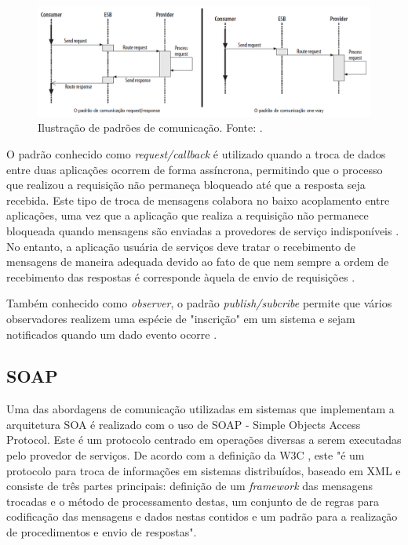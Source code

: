 \begin{figure}[htb]
\centering
\includegraphics[scale=0.5]{figuras/padroes_comunicacao.png}
\caption{Ilustração de padrões de comunicação. Fonte: \cite{josuttis_soa_2007}.}
\label{padroes_comunicacao}
\end{figure}

O padrão conhecido como \textit{request/callback} é utilizado quando a troca de dados entre duas aplicações ocorrem de forma assíncrona, permitindo que o processo que realizou a requisição não permaneça bloqueado até que a resposta seja recebida. Este tipo de troca de mensagens colabora no baixo acoplamento entre aplicações, uma vez que a aplicação que realiza a requisição não permanece bloqueada quando mensagens são enviadas a provedores de serviço indisponíveis \cite{josuttis_soa_2007}. No entanto, a aplicação usuária de serviços deve tratar o recebimento de mensagens de maneira adequada devido ao fato de que nem sempre a ordem de recebimento das respostas é corresponde àquela de envio de requisições \cite{josuttis_soa_2007}.

Também conhecido como \textit{observer}, o padrão \textit{publish/subcribe} permite que vários observadores realizem uma espécie de "inscrição" em um sistema e sejam notificados quando um dado evento ocorre  \cite{josuttis_soa_2007}.

\subsection{SOAP}
Uma das abordagens de comunicação utilizadas em sistemas que implementam a arquitetura SOA é realizado com o uso de SOAP - Simple Objects Access Protocol. Este é um protocolo centrado em operações diversas a serem executadas pelo provedor de serviços. De acordo com a definição da W3C \cite{box_simple_2000}, este "é um protocolo para troca de informações em sistemas distribuídos, baseado em XML e consiste de três partes principais: definição de um \textit{framework} das mensagens trocadas e o método de processamento destas, um conjunto de de regras para codificação das mensagens e dados nestas contidos e um padrão para a realização de procedimentos e envio de respostas".

